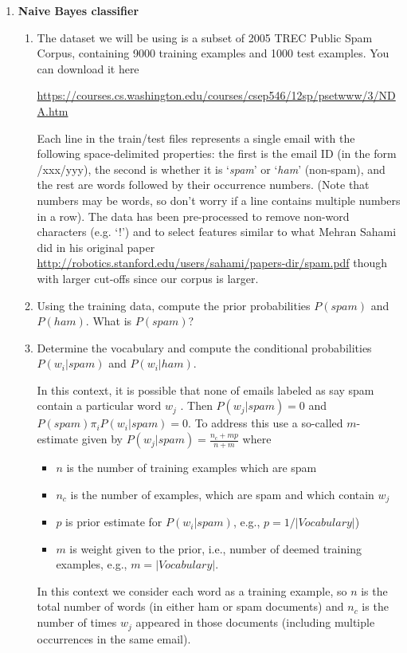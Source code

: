 \documentclass[11pt]{article}
\begin{document}
\begin{enumerate}
\item \textbf{Naive Bayes classifier}
\begin{enumerate}
\item The dataset we will be using is a subset of 2005 TREC Public Spam Corpus, containing 9000 training examples and 1000 test examples. You can download it here 

\url{https://courses.cs.washington.edu/courses/csep546/12sp/psetwww/3/NDA.htm}

Each line in the train/test files represents a single email with the following space-delimited properties: the first is the email ID (in the form /xxx/yyy), the second is whether it is ‘\emph{spam}’ or ‘\emph{ham}’ (non-spam), and the rest are words followed by their occurrence numbers. (Note that numbers may be words, so don’t worry if a line contains multiple numbers in a row). The data has been pre-processed to remove non-word characters (e.g. ‘!’) and to select features similar to what Mehran Sahami did in his original paper \url{http://robotics.stanford.edu/users/sahami/papers-dir/spam.pdf}
though with larger cut-offs since our corpus is larger.

\item Using the training data, compute the prior probabilities $P(spam)$ and $P(ham)$. What
is $P(spam)$?
\item Determine the vocabulary and compute the conditional probabilities $P(w_i |spam)$ and $P(w_i |ham)$.

In this context, it is possible that none of emails labeled as say spam contain a
particular word $w_j$ . Then $P(w_j |spam) = 0$ and $P(spam) \pi_i P (w_i |spam) = 0$. To
address this use a so-called $m$-estimate given by $P(w_j|spam) = \frac{n_c+mp}{n+m}$ where
\begin{itemize}
\item $n$ is the number of training examples which are spam
\item $n_c$ is the number of examples, which are spam and which contain $w_j$
\item $p$ is prior estimate for $P(w_i |spam)$, e.g., $p = 1/|Vocabulary|$)
\item $m$ is weight given to the prior, i.e., number of deemed training examples, e.g.,
$m = |Vocabulary|$.
\end{itemize}
In this context we consider each word as a training example, so $n$ is the total number of words (in either ham or spam documents) and $n_c$ is the number of times $w_j$ appeared in those documents (including multiple occurrences in the same email).


\end{enumerate}
\end{enumerate}
\end{document}

